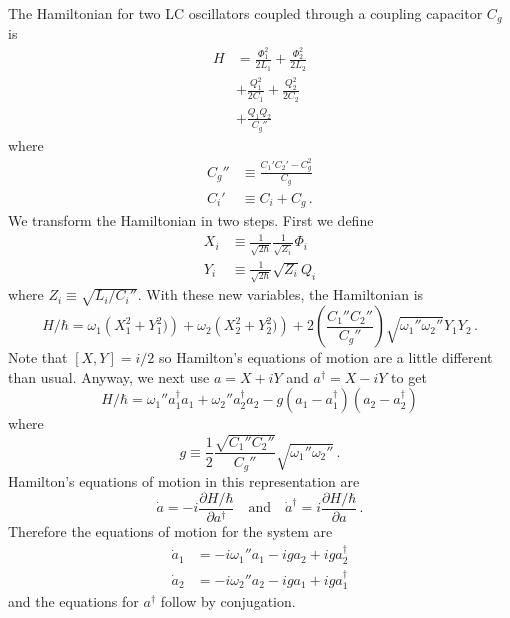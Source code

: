 The Hamiltonian for two LC oscillators coupled through a coupling capacitor $C_g$ is
\begin{align}
  H
  &= \frac{\Phi_1^2}{2 L_1} + \frac{\Phi_2^2}{2 L_2} \\
  &+ \frac{Q_1^2}{2 C_1} + \frac{Q_2^2}{2 C_2} \\
  &+ \frac{Q_1 Q_2}{C_g''}
\end{align}
where
\begin{align}
  C_g'' &\equiv \frac{C_1' C_2' - C_g^2}{C_g} \\
  C_i' &\equiv C_i + C_g \, .
\end{align}
We transform the Hamiltonian in two steps.
First we define
\begin{align*}
  X_i &\equiv \frac{1}{\sqrt{2 \hbar}} \frac{1}{\sqrt{Z_i}} \Phi_i \\
  Y_i &\equiv \frac{1}{\sqrt{2 \hbar}} \sqrt{Z_i} Q_i
\end{align*}
where $Z_i \equiv \sqrt{L_i / C_i''}$.
With these new variables, the Hamiltonian is
\begin{equation}
  H/\hbar =
    \omega_1 \left(X_1^2 + Y_1^2) \right)
  + \omega_2 \left(X_2^2 + Y_2^2) \right)
  + 2 \left( \frac{C_1'' C_2''}{C_g''} \right) \sqrt{\omega_1'' \omega_2''} Y_1 Y_2 \, .
\end{equation}
Note that $[X, Y] = i/2$ so Hamilton's equations of motion are a little different than usual.
Anyway, we next use $a = X + i Y$ and $a^\dagger = X - i Y$ to get
\begin{equation}
  H / \hbar =
    \omega_1'' a_1^\dagger a_1
  + \omega_2'' a_2^\dagger a_2
  - g (a_1 - a_1^\dagger) (a_2 - a_2^\dagger)
\end{equation}
where
\begin{equation}
  g \equiv \frac{1}{2} \frac{\sqrt{C_1'' C_2''}}{C_g''} \sqrt{\omega_1'' \omega_2''} \, .
\end{equation}
Hamilton's equations of motion in this representation are
\begin{equation*}
  \dot{a} = -i \frac{\partial H/\hbar}{\partial a^\dagger}
  \quad \text{and} \quad
  \dot{a}^\dagger = i \frac{\partial H/\hbar}{\partial a} \, .
\end{equation*}
Therefore the equations of motion for the system are
\begin{align*}
  \dot a_1 &= -i \omega_1'' a_1 -i g a_2 + i g a_2^\dagger \\
  \dot a_2 &= -i \omega_2'' a_2 -i g a_1 + i g a_1^\dagger
\end{align*}
and the equations for $a^\dagger$ follow by conjugation.

